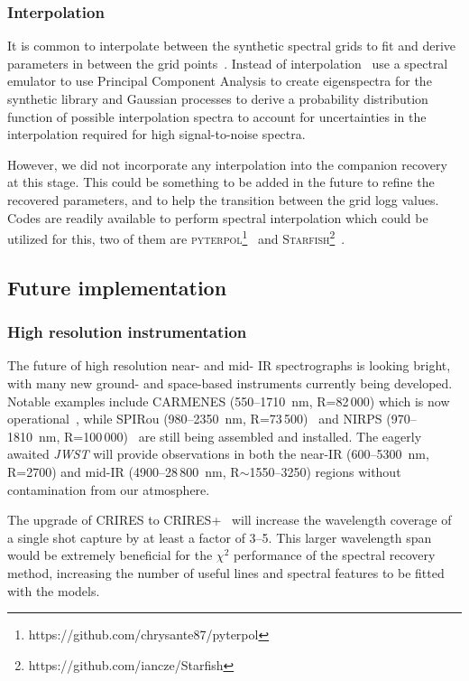 \documentclass[fleqn,usenatbib]{mnras}
\begin{document}
\subsubsection{Interpolation}
\label{subsubsec:interpolation}
It is common to interpolate between the synthetic spectral grids to fit and derive parameters in between the grid points~\citep[e.g.][]{nemravova_xtauri_2016, passegger_fundamental_2016}. Instead of interpolation~\citet{czekala_constructing_2015} use a spectral emulator to use Principal Component Analysis to create eigenspectra for the synthetic library and Gaussian processes to derive a probability distribution function of possible interpolation spectra to account for uncertainties in the interpolation required for high signal-to-noise spectra.

However, we did not incorporate any interpolation into the companion recovery at this stage. This could be something to be added in the future to refine the recovered parameters, and to help the transition between the grid logg values. Codes are readily available to perform spectral interpolation which could be utilized for this, two of them are \textsc{pyterpol}\footnote{https://github.com/chrysante87/pyterpol}~\citet{nemravova_xtauri_2016} and \textsc{Starfish}\footnote{https://github.com/iancze/Starfish}~\citep{czekala_constructing_2015}.

\subsection{Future implementation}
\label{subsec:future}
\subsubsection{High resolution instrumentation}
\label{subsubsec:highres}
The future of high resolution near- and mid- IR spectrographs is looking bright, with many new ground- and space-based instruments currently being developed. Notable examples include CARMENES (550--1710~nm, R=82\,000) which is now operational~\citep{quirrenbach_carmenes_2014}, while SPIRou (980--2350~nm, R=73\,500)~\citep{artigau_spirou_2014} and NIRPS (970--1810~nm, R=100\,000)~\citep{bouchy_nearinfrared_2017} are still being assembled and installed. The eagerly awaited \textit{JWST} \citep{gardner_james_2006} will provide observations in both the near-IR (600--5300~nm, R=2700) and mid-IR (4900--28\,800~nm, R$\sim$1550--3250) regions without contamination from our atmosphere.

The upgrade of CRIRES to CRIRES+~\citep{dorn_crires_2016} will increase the wavelength coverage of a single shot capture by at least a factor of 3--5. This larger wavelength span would be extremely beneficial for the \(\chi^2\) performance of the spectral recovery method, increasing the number of useful lines and spectral features to be fitted with the models.
\end{document}
